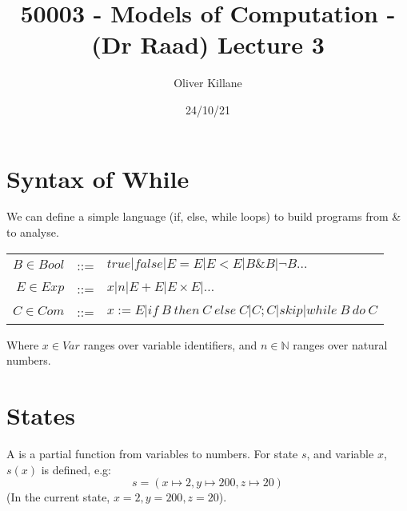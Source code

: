 \documentclass{report}
\title{50003 - Models of Computation - (Dr Raad) Lecture 3}
\author{Oliver Killane}
\date{24/10/21}
\begin{document}
    \maketitle

    \section*{Syntax of While}
        We can define a simple  language (if, else, while loops) to build programs from \& to analyse.
        \begin{center}
            \begin{tabular}{r c l}
                $B \in Bool$ & ::= & $true | false | E = E | E < E | B \& B | \neg B \dots$ \\
                $E \in Exp$ & ::= & $x | n | E + E | E \times E | \dots$ \\
                $C \in Com$ & ::= & $x :=E | if \ B \ then \ C \ else \ C | C;C | skip | while \ B \ do \ C$ \\
            \end{tabular}
        \end{center}
        Where $x \in Var$ ranges over variable identifiers, and $n \in \mathbb{N}$ ranges over natural numbers.
    
    \section*{States}
        A  is a partial function from variables to numbers. For state $s$, and variable $x$, $s(x)$ is defined, e.g:
        \[s = (x \mapsto 2, y \mapsto 200, z \mapsto 20)\]
        (In the current state, $x = 2, y = 200, z = 20$).
\end{document}
